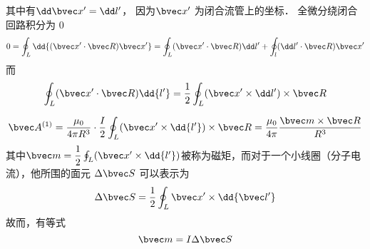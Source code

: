 其中有$\dd \bvec x^{\prime}=\dd l^{\prime}$， 因为$ \bvec x^{\prime}$ 为闭合流管上的坐标．
全微分绕闭合回路积分为 $0$
\begin{equation}
0=\oint_L \dd{(\bvec x^{\prime}\cdot \bvec R)\bvec x^{\prime}}=\oint_L (\bvec x^{\prime}\cdot\bvec R)\dd l^{\prime}+\oint_l (\dd l^{\prime}\cdot \bvec R)\bvec x^{\prime}\label{edy33_eq8}
\end{equation}
而
\begin{equation}
\oint_L (\bvec x^{\prime}\cdot \bvec R)\dd{l^{\prime}}=\dfrac1 2\oint_L (\bvec x^{\prime}\times \dd l^{\prime})\times \bvec R \label{edy33_eq9}
\end{equation}

\begin{equation}
\bvec A^{(1)}=\dfrac{\mu_0}{4\pi R^3}\cdot\dfrac{I}{2}\oint_L (\bvec x^{\prime}\times \dd{l^{\prime}})\times \bvec R=\dfrac{\mu_0}{4\pi}\dfrac{\bvec m \times \bvec R}{R^3}\label{edy33_eq10}
\end{equation}
其中$\bvec m =\dfrac{1}{2}\oint_L (\bvec x^{\prime}\times \dd{l^{\prime}})$被称为磁矩，而对于一个小线圈（分子电流），他所围的面元 $\Delta\bvec S$ 可以表示为
\begin{equation}
\Delta\bvec S=\dfrac 1 2\oint_L \bvec x^{\prime}\times \dd{\bvec l^{\prime}}
\end{equation}
故而，有等式
\begin{equation}
\bvec m=I\Delta \bvec S
\end{equation}
